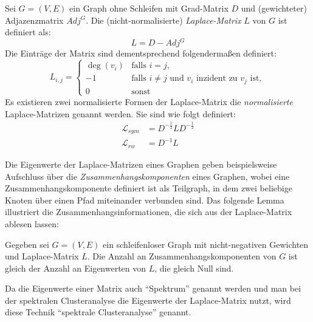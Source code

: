 \begin{definition}
\label{def:laplace-matrix}
	Sei $G=(V,E)$ ein Graph ohne Schleifen mit Grad-Matrix $D$ und (gewichteter) Adjazenzmatrix $Adj^G$.
	Die (nicht-normalisierte) \emph{Laplace-Matrix} $L$ von $G$ ist definiert als:
	\[ L = D - Adj^G \]
	Die Einträge der Matrix sind dementsprechend folgendermaßen definiert:
	\[ L_{i,j} = 	\begin{cases}
						\deg(v_i) & \textrm{falls } i = j, \\
						-1 & \textrm{falls } i \neq j \textrm{ und $v_i$ inzident zu $v_j$ ist}, \\
						0 & \textrm{sonst}
					\end{cases}
	\]
	Es existieren zwei normalisierte Formen der Laplace-Matrix die \emph{normalisierte} Laplace-Matrizen genannt werden.
	Sie sind wie folgt definiert:
	\begin{align*}
		\mathcal{L}_{sym} &= D^{-\frac{1}{2}} L D^{-\frac{1}{2}} \\
		\mathcal{L}_{rw} &= D^{-1} L
	\end{align*}
\end{definition}
Die Eigenwerte der Laplace-Matrizen eines Graphen geben beispielsweise Aufschluss über die \emph{Zusammenhangskomponenten} eines
Graphen, wobei eine Zusammenhangskomponente definiert ist als Teilgraph, in dem zwei beliebige Knoten über einen Pfad
miteinander verbunden sind. Das folgende Lemma illustriert die Zusammenhangsinformationen, die sich aus der Laplace-Matrix
ablesen lassen:

\begin{lemma}
\label{lemma:connectivity-laplace-spectrum}
	Gegeben sei $G=(V,E)$ ein schleifenloser Graph mit nicht-negativen Gewichten und Laplace-Matrix $L$. Die Anzahl an
	Zusammenhangskomponenten von $G$ ist gleich der Anzahl an Eigenwerten von $L$, die gleich Null sind.
\end{lemma}
Da die Eigenwerte einer Matrix auch "`Spektrum"' genannt werden und man bei der spektralen Clusteranalyse die Eigenwerte
der Laplace-Matrix nutzt, wird diese Technik "`spektrale Clusteranalyse"' genannt.